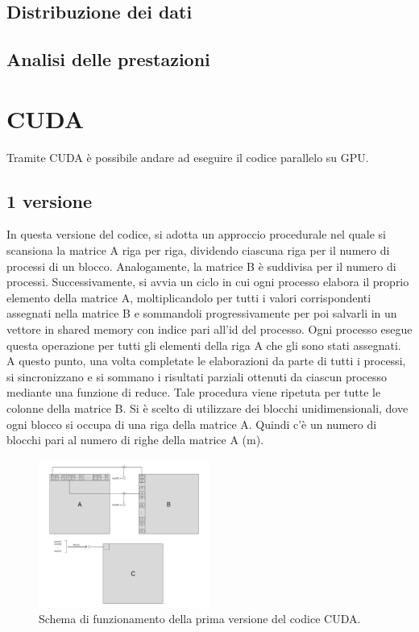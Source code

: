 \documentclass[conference]{IEEEtran}
\begin{document}
\subsection{Distribuzione dei dati}

\subsection{Analisi delle prestazioni}

\section{CUDA}
Tramite CUDA è possibile andare ad eseguire il codice parallelo su GPU.

\subsection{1 versione}
In questa versione del codice, si adotta un approccio procedurale nel quale si scansiona la matrice A riga per riga, dividendo ciascuna riga per il numero di processi di un blocco. Analogamente, la matrice B è suddivisa per il numero di processi. Successivamente, si avvia un ciclo in cui ogni processo elabora il proprio elemento della matrice A, moltiplicandolo per tutti i valori corrispondenti assegnati nella matrice B e sommandoli progressivamente per poi salvarli in un vettore in shared memory con indice pari all'id del processo. Ogni processo esegue questa operazione per tutti gli elementi della riga A che gli sono stati assegnati. A questo punto, una volta completate le elaborazioni da parte di tutti i processi, si sincronizzano e si sommano i risultati parziali ottenuti da ciascun processo mediante una funzione di reduce. Tale procedura viene ripetuta per tutte le colonne della matrice B. Si è scelto di utilizzare dei blocchi unidimensionali, dove ogni blocco si occupa di una riga della matrice A. Quindi c'è un numero di blocchi pari al numero di righe della matrice A (m). 

\begin{figure}
    \centering
    \includegraphics[width=0.5\textwidth]{resources/cuda_scheme.png}
    \caption{Schema di funzionamento della prima versione del codice CUDA.}
    \label{fig:cuda_scheme}
\end{figure}
\end{document}

